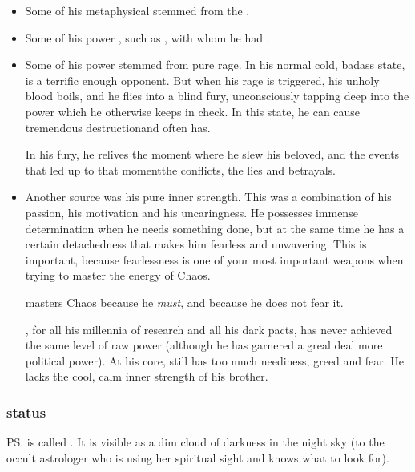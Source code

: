 \begin{itemize}
  \item 
    Some of his metaphysical stemmed from the \xss. 
  \item 
    Some of his power , such as , with whom he had . 
  \item 
    Some of his power stemmed from pure rage.
    In his normal cold, badass state, \Ishnaruchaefir{} is a terrific enough opponent. 
    But when his rage is triggered, his unholy \xzaishannic{} blood boils, and he flies into a blind fury, unconsciously tapping deep into the \chaotic{} power which he otherwise keeps in check. 
    In this state, he can cause tremendous destruction\dash and often has.
    
    In his fury, he relives the moment where he slew his beloved, and the events that led up to that moment\dash the conflicts, the lies and betrayals.
  \item 
    Another source was his pure inner strength. 
    This was a combination of his passion, his motivation and his uncaringness. 
    He possesses immense determination when he needs something done, but at the same time he has a certain detachedness that makes him fearless and unwavering. This is important, because fearlessness is one of your most important weapons when trying to master the energy of Chaos. 
    
    \Ishnaruchaefir{} masters Chaos because he \emph{must}, and because he does not fear it.
    
    , for all his millennia of research and all his dark pacts, has never achieved the same level of raw power (although he has garnered a greal deal more political power). At his core, \Secherdamon{} still has too much neediness, greed and fear. He lacks the cool, calm inner strength of his brother. 
\end{itemize}









\subsubsection{\Vertex{} status}
\ps{\Ishnaruchaefir} \vertex{} is called . 
It is visible as a dim cloud of darkness in the night sky (to the occult astrologer who is using her spiritual sight and knows what to look for). 

